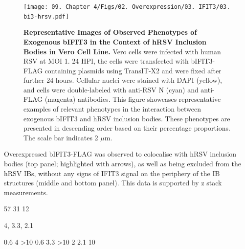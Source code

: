 \begin{figure}
    \centering
    \texttt{[image: 09. Chapter 4/Figs/02. Overexpression/03. IFIT3/03. bi3-hrsv.pdf]}
    \caption[Representative Images of Observed Phenotypes of Exogenous bIFIT3 in the Context of hRSV Inclusion Bodies in Vero Cell Line.]{\textbf{Representative Images of Observed Phenotypes of Exogenous bIFIT3 in the Context of hRSV Inclusion Bodies in Vero Cell Line.} Vero cells were infected with human RSV at MOI 1. 24 HPI, the cells were transfected with bIFIT3-FLAG containing plasmids using TransIT-X2 and were fixed after further 24 hours. Cellular nuclei were stained with DAPI (yellow), and cells were double-labeled with anti-RSV N (cyan) and anti-FLAG (magenta) antibodies. This figure showcases representative examples of relevant phenotypes in the interaction between exogenous bIFIT3 and hRSV inclusion bodies. These phenotypes are presented in descending order based on their percentage proportions. The scale bar indicates 2 \(\mu \mbox{m}\).}
    \label{fig:Representative Images of Observed Phenotypes of Exogenous bIFIT3 in the Context of hRSV Inclusion Bodies in VERO Cell Line}
\end{figure}



Overexpressed bIFIT3-FLAG was observed to colocalise with hRSV inclusion bodies (top panel; highlighted with arrows), as well as being excluded from the hRSV IBs, without any signs of IFIT3 signal on the periphery of the IB structures (middle and bottom panel). This data is supported by z stack measurements.

57 31 12

4, 3.3, 2.1

0.6 4 >10
0.6 3.3 >10
2 2.1 10

